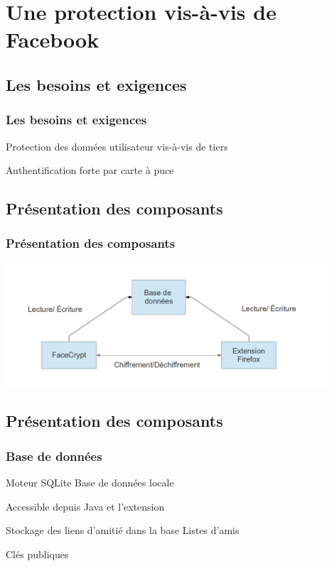 \documentclass{beamer}
\begin{document}
\section{Une protection vis-à-vis de Facebook}

\subsection{Les besoins et exigences}
\begin{frame}
    \frametitle{Les besoins et exigences}
    \begin{block}{}

        Protection des données utilisateur vis-à-vis de tiers

        Authentification forte par carte à puce 
    \end{block}
\end{frame}

\subsection{Présentation des composants}
\begin{frame}
    \frametitle{Présentation des composants}
    \includegraphics[width=12cm]{schema_zako}
\end{frame}


\subsection{Présentation des composants}
\begin{frame}
    \frametitle{Base de données}
    \begin{block}{Moteur SQLite }
        Base de données locale

        Accessible depuis Java et l'extension 
    \end{block}
    \begin{block}{Stockage des liens d'amitié dans la base}
        Listes d'amis


        Clés publiques


    \end{block}
\end{frame}
\end{document}
